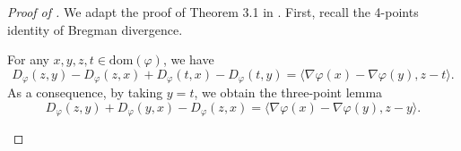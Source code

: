 \begin{proof}[Proof of ]
We adapt the proof of Theorem 3.1 in \citep{Lu18}.
First, recall the 4-points identity of Bregman divergence.
\begin{lemma}
    \label{lemma:four-points}
    For any $x, y, z, t \in \text{dom}(\varphi)$, we have
    \begin{equation*}
    D_{\varphi}(z, y) - D_{\varphi}(z,x) + D_{\varphi}(t, x) - D_{\varphi}(t, y)
    = \langle \nabla \varphi(x) - \nabla \varphi(y), z - t \rangle.
    \end{equation*}
    As a consequence, by taking $y = t$, we obtain the three-point lemma
    \begin{equation*}
    D_{\varphi}(z, y) + D_{\varphi}(y, x) - D_{\varphi}(z, x)
    = \langle \nabla \varphi(x) - \nabla \varphi(y), z - y \rangle.
    \end{equation*}
\end{lemma}


\end{proof}

